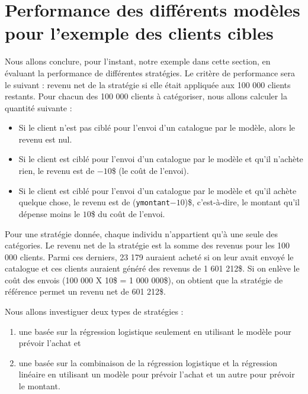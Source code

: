 \documentclass[
  11pt,
  letterpaper,
]{book}
\providecommand{\tightlist}{%
  \setlength{\itemsep}{0pt}\setlength{\parskip}{0pt}}
\theoremstyle{definition}
\theoremstyle{definition}
\theoremstyle{definition}
\theoremstyle{remark}
\begin{document}
\hypertarget{performance-des-diffuxe9rents-moduxe8les-pour-lexemple-des-clients-cibles}{%
\section{Performance des différents modèles pour l'exemple des clients cibles}\label{performance-des-diffuxe9rents-moduxe8les-pour-lexemple-des-clients-cibles}}

Nous allons conclure, pour l'instant, notre exemple dans cette section, en évaluant la performance de différentes stratégies. Le critère de performance sera le suivant : revenu net de la stratégie si elle était appliquée aux 100 000 clients restants. Pour chacun des 100 000 clients à catégoriser, nous allons calculer la quantité suivante :

\begin{itemize}
\tightlist
\item
  Si le client n'est pas ciblé pour l'envoi d'un catalogue par le modèle, alors le revenu est nul.
\item
  Si le client est ciblé pour l'envoi d'un catalogue par le modèle et qu'il n'achète rien, le revenu est de \(-10\)\$ (le coût de l'envoi).
\item
  Si le client est ciblé pour l'envoi d'un catalogue par le modèle et qu'il achète quelque chose, le revenu est de (\texttt{ymontant}\(-10\))\$, c'est-à-dire, le montant qu'il dépense moins le \(10\)\$ du coût de l'envoi.
\end{itemize}

Pour une stratégie donnée, chaque individu n'appartient qu'à une seule des catégories. Le revenu net de la stratégie est la somme des revenus pour les 100 000 clients. Parmi ces derniers, 23 179 auraient acheté si on leur avait envoyé le catalogue et ces clients auraient généré des revenus de 1 601 212\$. Si on enlève le coût des envois (100 000 X 10\$ = 1 000 000\$), on obtient que la stratégie de référence permet un revenu net de 601 212\$.

Nous allons investiguer deux types de stratégies :

\begin{enumerate}
\def\labelenumi{\arabic{enumi})}
\tightlist
\item
  une basée sur la régression logistique seulement en utilisant le modèle pour prévoir l'achat et
\item
  une basée sur la combinaison de la régression logistique et la régression linéaire en utilisant un modèle pour prévoir l'achat et un autre pour prévoir le montant.
\end{enumerate}
\end{document}

